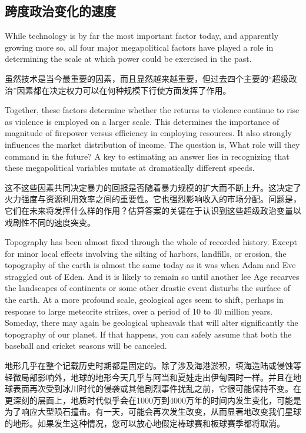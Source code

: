 \begin{Parallel}{97mm}{45mm}
  \section{跨度政治变化的速度}


  \ParallelLText
  {While technology is by far the most important factor today, and apparently growing more so, all four major megapolitical factors have played a role in determining the scale at which power could be exercised in the past.}
  
  \ParallelRText
  {虽然技术是当今最重要的因素，而且显然越来越重要，但过去四个主要的“超级政治”因素都在决定权力可以在何种规模下行使方面发挥了作用。}
  \ParallelPar


  \ParallelLText
  {Together, these factors determine whether the returns to violence continue to rise as violence is employed on a larger scale. This determines the importance of magnitude of firepower versus efficiency in employing resources. It also strongly influences the market distribution of income. The question is, What role will they command in the future? A key to estimating an answer lies in recognizing that these megapolitical variables mutate at dramatically different speeds.}
  
  \ParallelRText
  {这不这些因素共同决定暴力的回报是否随着暴力规模的扩大而不断上升。这决定了火力强度与资源利用效率之间的重要性。它也强烈影响收入的市场分配。问题是，它们在未来将发挥什么样的作用？估算答案的关键在于认识到这些超级政治变量以戏剧性不同的速度突变。}
  \ParallelPar



  \ParallelLText
  {Topography has been almost fixed through the whole of recorded history. Except for minor local effects involving the silting of harbors, landfills, or erosion, the topography of the earth is almost the same today as it was when Adam and Eve straggled out of Eden. And it is likely to remain so until another lee Age recarves the landscapes of continents or some other drastic event disturbs the surface of the earth. At a more profound scale, geological ages seem to shift, perhaps in response to large meteorite strikes, over a period of 10 to 40 million years. Someday, there may again be geological upheavals that will alter significantly the topography of our planet. If that happens, you can safely assume that both the baseball and cricket seasons will be canceled.}
  
  \ParallelRText
  {地形几乎在整个记载历史时期都是固定的。除了涉及海港淤积，填海造陆或侵蚀等轻微局部影响外，地球的地形今天几乎与阿当和夏娃走出伊甸园时一样。并且在地球表面再次受到冰川时代的侵袭或其他剧烈事件扰乱之前，它很可能保持不变。在更深刻的层面上，地质时代似乎会在1000万到4000万年的时间内发生变化，可能是为了响应大型陨石撞击。有一天，可能会再次发生改变，从而显著地改变我们星球的地形。如果发生这种情况，您可以放心地假定棒球赛和板球赛季都将取消。}
  \ParallelPar



\end{Parallel}

